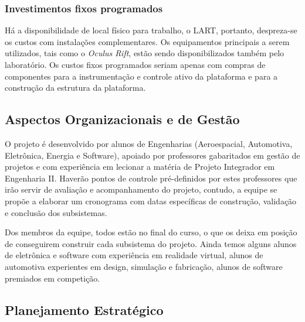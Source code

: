 \subsubsection{Investimentos fixos programados} 
	Há a disponibilidade de local físico para trabalho, o LART, portanto, despreza-se os custos com instalações complementares. Os equipamentos principais a serem utilizados, tais como o \textit{Oculus Rift}, estão sendo disponibilizados também pelo laboratório. Os custos fixos programados seriam apenas com compras de componentes para a instrumentação e controle ativo da plataforma e para a construção da estrutura da plataforma.

\subsection{Aspectos Organizacionais e de Gestão}
	
	O projeto é desenvolvido por alunos de Engenharias (Aeroespacial, Automotiva, Eletrônica, Energia e Software), apoiado por professores gabaritados em gestão de projetos e com experiência em lecionar a matéria de Projeto Integrador em Engenharia II. Haverão pontos de controle pré-definidos por estes professores que irão servir de avaliação e acompanhamento do projeto, contudo, a equipe se propõe a elaborar um cronograma com datas específicas de construção, validação e conclusão dos subsistemas.
    
	Dos membros da equipe, todos estão no final do curso, o que os deixa em posição de conseguirem construir cada subsistema do projeto. Ainda temos alguns alunos de eletrônica e software com experiência em realidade virtual, alunos de automotiva experientes em design, simulação e fabricação, alunos de software premiados em competição.
	
\subsection{Planejamento Estratégico}

